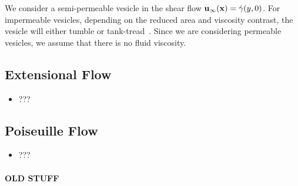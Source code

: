 \documentclass[aps,prl,showpacs]{revtex4}
\newif\ifTikz
\begin{document}
We consider a semi-permeable vesicle in the shear flow
$\mathbf{u}_{\infty}(\mathbf{x}) = \dot{\gamma} (y,0)$. For impermeable vesicles,
depending on the reduced area and viscosity contrast, the vesicle will
either tumble or tank-tread~\cite{fin-lam-sei-gom2008}. Since we are
considering permeable vesicles, we assume that there is no fluid
viscosity. 


\ifTikz

\fi

\subsection{Extensional Flow}
\begin{itemize}
  \item ???
\end{itemize}

\ifTikz

\fi

\subsection{Poiseuille Flow}
\begin{itemize}
  \item ???
\end{itemize}



 
 




 \newpage
 \paragraph{\bf \Huge OLD STUFF}

\end{document}
